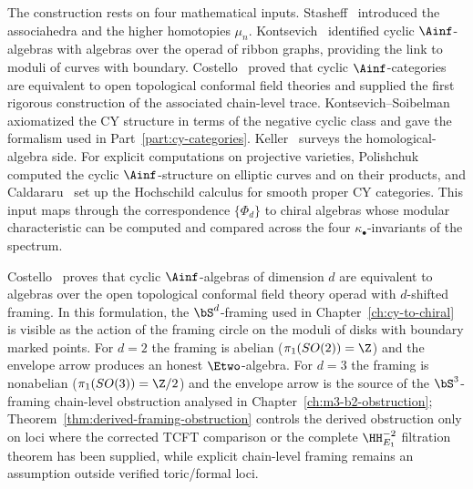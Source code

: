 \begin{remark}
\label{rem:cyclic-ainf-prior-work}
The construction rests on four mathematical inputs. Stasheff~\cite{Stasheff1963} introduced the associahedra and the higher homotopies $\mu_n$. Kontsevich~\cite{Kontsevich1995} identified cyclic $\Ainf$-algebras with algebras over the operad of ribbon graphs, providing the link to moduli of curves with boundary. Costello~\cite{Costello2005TCFT,Costello2007Ainfty} proved that cyclic $\Ainf$-categories are equivalent to open topological conformal field theories and supplied the first rigorous construction of the associated chain-level trace. Kontsevich--Soibelman~\cite{KontsevichSoibelman2009} axiomatized the CY structure in terms of the negative cyclic class and gave the formalism used in Part~\ref{part:cy-categories}. Keller~\cite{Keller2001Ainfty} surveys the homological-algebra side. For explicit computations on projective varieties, Polishchuk~\cite{Polishchuk2011} computed the cyclic $\Ainf$-structure on elliptic curves and on their products, and Caldararu~\cite{Caldararu2005} set up the Hochschild calculus for smooth proper CY categories. This input maps through the correspondence $\{\Phi_d\}$ to chiral algebras whose modular characteristic can be computed and compared across the four $\kappa_\bullet$-invariants of the spectrum.
\end{remark}

\begin{remark}
\label{rem:costello-operadic}
Costello~\cite{Costello2005TCFT} proves that cyclic $\Ainf$-algebras of dimension $d$ are equivalent to algebras over the open topological conformal field theory operad with $d$-shifted framing. In this formulation, the $\bS^d$-framing used in Chapter~\ref{ch:cy-to-chiral} is visible as the action of the framing circle on the moduli of disks with boundary marked points. For $d = 2$ the framing is abelian ($\pi_1(SO(2)) = \Z$) and the envelope arrow produces an honest $\Etwo$-algebra. For $d = 3$ the framing is nonabelian ($\pi_1(SO(3)) = \Z/2$) and the envelope arrow is the source of the $\bS^3$-framing chain-level obstruction analysed in Chapter~\ref{ch:m3-b2-obstruction}; Theorem~\ref{thm:derived-framing-obstruction} controls the derived obstruction only on loci where the corrected TCFT comparison or the complete $\HH^{-2}_{E_1}$ filtration theorem has been supplied, while explicit chain-level framing remains an assumption outside verified toric/formal loci.
\end{remark}


